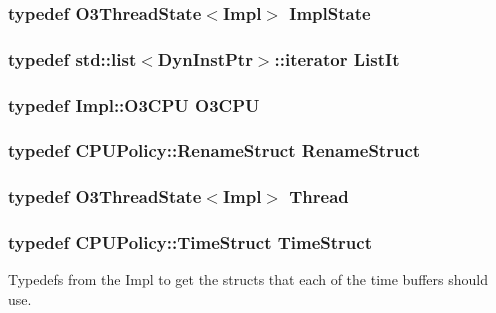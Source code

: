 \label{classFullO3CPU_a8ca44c33753253e21ca215123e8b5005}
\hypertarget{classFullO3CPU_a19d73166363cbf2e4ed0ddec44afa8d4}{
\subsubsection[{ImplState}]{\setlength{\rightskip}{0pt plus 5cm}typedef {\bf O3ThreadState}$<$Impl$>$ {\bf ImplState}}}
\label{classFullO3CPU_a19d73166363cbf2e4ed0ddec44afa8d4}
\hypertarget{classFullO3CPU_a184cb829e22cc656acb41864f68f51ea}{
\subsubsection[{ListIt}]{\setlength{\rightskip}{0pt plus 5cm}typedef {\bf std::list}$<${\bf DynInstPtr}$>$::iterator {\bf ListIt}}}
\label{classFullO3CPU_a184cb829e22cc656acb41864f68f51ea}
\hypertarget{classFullO3CPU_a44622cf06940413482836cb62931ac3f}{
\subsubsection[{O3CPU}]{\setlength{\rightskip}{0pt plus 5cm}typedef Impl::O3CPU {\bf O3CPU}}}
\label{classFullO3CPU_a44622cf06940413482836cb62931ac3f}
\hypertarget{classFullO3CPU_a494521ebae1f8b01fe0ed16320494e6a}{
\subsubsection[{RenameStruct}]{\setlength{\rightskip}{0pt plus 5cm}typedef CPUPolicy::RenameStruct {\bf RenameStruct}}}
\label{classFullO3CPU_a494521ebae1f8b01fe0ed16320494e6a}
\hypertarget{classFullO3CPU_ad5e0f9b655492f45720f8d756f11d3b5}{
\subsubsection[{Thread}]{\setlength{\rightskip}{0pt plus 5cm}typedef {\bf O3ThreadState}$<$Impl$>$ {\bf Thread}}}
\label{classFullO3CPU_ad5e0f9b655492f45720f8d756f11d3b5}
\hypertarget{classFullO3CPU_aa6c328aeb664577b61817285d04f3631}{
\subsubsection[{TimeStruct}]{\setlength{\rightskip}{0pt plus 5cm}typedef CPUPolicy::TimeStruct {\bf TimeStruct}}}
\label{classFullO3CPU_aa6c328aeb664577b61817285d04f3631}
Typedefs from the Impl to get the structs that each of the time buffers should use. 

